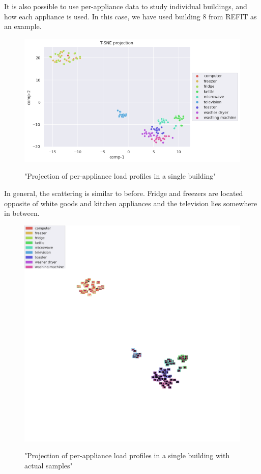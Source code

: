 It is also possible to use per-appliance data to study
individual buildings, and how each appliance is used.
In this case, we have used building 8 from REFIT as an example.

\begin{figure}[H]
	\centering
	\caption{"Projection of per-appliance load profiles in a single building"}
	\includegraphics[width=.8\textwidth]{Figures/TSNE/TSNE_results/refit/scatter_refit_8.png}
	\label{fig:tsne_papb_scatter_ent_refit8}
\end{figure}

In general, the scattering is similar to before.
Fridge and freezers are located opposite of white goods and kitchen appliances and 
the television lies somewhere in between. 

\begin{figure}[H]
	\centering
	\caption{"Projection of per-appliance load profiles in a single building with actual samples"}
	\includegraphics[width=.9\textwidth]{Figures/TSNE/TSNE_results/refit/img_scatter_refit8.png}
	\label{fig:tsne_papb_img_scatter_ent_refit8}
\end{figure}

